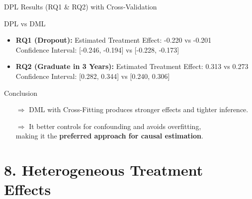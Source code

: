 \documentclass[aspectratio=169]{beamer}
\begin{document}
\begin{frame}{DPL Results (RQ1 \& RQ2) with Cross-Validation}

\vspace{10pt}
\begin{alertblock}{DPL vs DML}
\begin{itemize}[label=--, itemsep=2pt]
    \item \textbf{RQ1 (Dropout):} Estimated Treatment Effect: -0.220 vs -0.201 \\
    Confidence Interval: [-0.246, -0.194] vs [-0.228, -0.173]
    
    \item \textbf{RQ2 (Graduate in 3 Years):} Estimated Treatment Effect: 0.313 vs 0.273 \\
    Confidence Interval: [0.282, 0.344] vs [0.240, 0.306]
\end{itemize}
\end{alertblock}

\vspace{5pt}
\begin{exampleblock}{Conclusion}
\vspace{-2pt}
\begin{itemize}
    \item[$\Rightarrow$] DML with Cross-Fitting produces stronger effects and tighter inference.
    \item[$\Rightarrow$] It better controls for confounding and avoids overfitting,\\ making it the \textbf{preferred approach for causal estimation}.
\end{itemize}
\vspace{-3pt}
\end{exampleblock}

\end{frame}



\section{8. Heterogeneous Treatment Effects}
\end{document}
